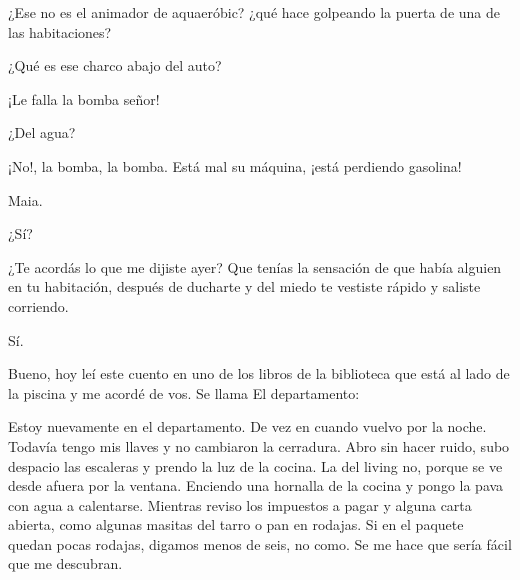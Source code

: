 \documentclass[12pt,twoside,openright,a5paper]{book}
\begin{document}
\vspace{0.5cm}
\hrulefill\hspace{0.2cm} \decofourleft\decofourright \hspace{0.2cm} \hrulefill
\vspace{0.5cm}

¿Ese no es el animador de aquaeróbic? ¿qué hace golpeando la puerta
de una de las habitaciones?


\vspace{0.5cm}
\hrulefill\hspace{0.2cm} \decofourleft\decofourright \hspace{0.2cm} \hrulefill
\vspace{0.5cm}

¿Qué es ese charco abajo del auto?

¡Le falla la bomba señor!

¿Del agua?

¡No!, la bomba, la bomba. Está mal su máquina, ¡está perdiendo gasolina!


\vspace{0.5cm}
\hrulefill\hspace{0.2cm} \decofourleft\decofourright \hspace{0.2cm} \hrulefill
\vspace{0.5cm}

Maia.

¿Sí?

¿Te acordás lo que me dijiste ayer? Que tenías la sensación de que había
alguien en tu habitación, después de ducharte y del miedo te vestiste
rápido y saliste corriendo.

Sí.

Bueno, hoy leí este cuento en uno de los libros de la biblioteca que está
al lado de la piscina y me acordé de vos. Se llama El departamento:

Estoy nuevamente en el departamento. De vez en cuando vuelvo por la
noche. Todavía tengo mis llaves y no cambiaron la cerradura. Abro sin hacer
ruido, subo despacio las escaleras y prendo la luz de la cocina. La del
living no, porque se ve desde afuera por la ventana. Enciendo una hornalla
de la cocina y pongo la pava con agua a calentarse. Mientras reviso los
impuestos a pagar y alguna carta abierta, como algunas masitas del tarro
o pan en rodajas. Si en el paquete quedan pocas rodajas, digamos menos de
seis, no como. Se me hace que sería fácil que me descubran.
\end{document}
